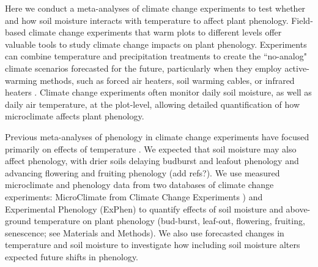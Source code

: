 \documentclass{article}
\begin{document}
\par Here we conduct a meta-analyses of climate change experiments to test whether and how soil moisture interacts with temperature to affect plant phenology. Field-based climate change experiments that warm plots to different levels offer valuable tools to study climate change impacts on plant phenology. Experiments can combine temperature and precipitation treatments to create the ``no-analog" climate scenarios forecasted for the future, particularly when they employ active-warming methods, such as forced air heaters, soil warming cables, or infrared heaters \citep{shaver2000,williams2007b,aronson2009}. Climate change experiments often monitor daily soil moisture, as well as daily air temperature, at the plot-level, allowing detailed quantification of how microclimate affects plant phenology. 
\par Previous meta-analyses of phenology in climate change experiments have focused primarily on effects of temperature \citep[e.g.,][]{wolkovich2012}. We expected that soil moisture may also affect phenology, with drier soils delaying budburst and leafout phenology and advancing flowering and fruiting phenology (add refs?).  We use measured microclimate and phenology data from two databases of climate change experiments: MicroClimate from Climate Change Experiments \citep[MC3E, ][]{ettinger2018}) and Experimental Phenology (ExPhen)  to quantify effects of soil moisture and above-ground temperature on plant phenology (bud-burst, leaf-out, flowering, fruiting, senescence; see Materials and Methods). We also use forecasted changes in temperature and soil moisture to investigate how including soil moisture alters expected future shifts in phenology. 
\end{document}
